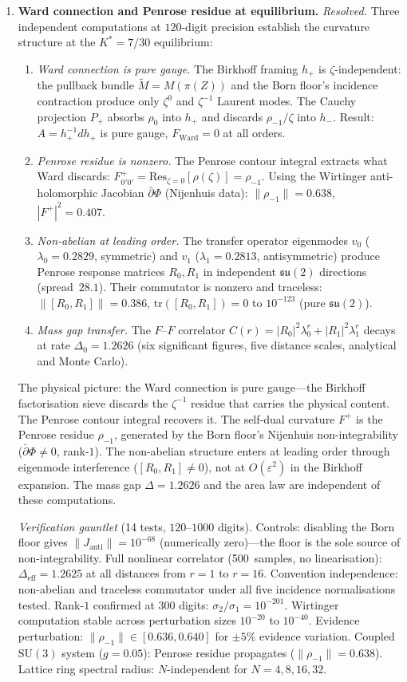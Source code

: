\documentclass[11pt,a4paper]{article}
\theoremstyle{definition}
\theoremstyle{remark}
\newcommand{\dbar}{\bar{\partial}}
\newcommand{\SU}{\mathrm{SU}}
\newcommand{\su}{\mathfrak{su}}
\begin{document}
\begin{enumerate}[nosep]
\item \textbf{Ward connection and Penrose residue at equilibrium.} \emph{Resolved.} Three independent computations at $120$-digit precision establish the curvature structure at the $K^*=7/30$ equilibrium:
\begin{enumerate}[nosep]
\item \emph{Ward connection is pure gauge.} The Birkhoff framing $h_+$ is $\zeta$-independent: the pullback bundle $\tilde{M}=M(\pi(Z))$ and the Born floor's incidence contraction produce only $\zeta^0$ and $\zeta^{-1}$ Laurent modes. The Cauchy projection $P_+$ absorbs $\rho_0$ into $h_+$ and discards $\rho_{-1}/\zeta$ into $h_-$. Result: $A=h_+^{-1}dh_+$ is pure gauge, $F_{\mathrm{Ward}}=0$ at all orders.
\item \emph{Penrose residue is nonzero.} The Penrose contour integral extracts what Ward discards: $F^+_{0'0'}=\mathrm{Res}_{\zeta=0}[\rho(\zeta)]=\rho_{-1}$. Using the Wirtinger anti-holomorphic Jacobian $\dbar\Phi$ (Nijenhuis data): $\|\rho_{-1}\|=0.638$, $|F^+|^2=0.407$.
\item \emph{Non-abelian at leading order.} The transfer operator eigenmodes $v_0$ ($\lambda_0=0.2829$, symmetric) and $v_1$ ($\lambda_1=0.2813$, antisymmetric) produce Penrose response matrices $R_0,R_1$ in independent $\su(2)$ directions (spread~$28.1$). Their commutator is nonzero and traceless: $\|[R_0,R_1]\|=0.386$, $\mathrm{tr}([R_0,R_1])=0$ to $10^{-123}$ (pure $\su(2)$).
\item \emph{Mass gap transfer.} The $F$--$F$ correlator $C(r)=|R_0|^2\lambda_0^r+|R_1|^2\lambda_1^r$ decays at rate $\Delta_0=1.2626$ (six significant figures, five distance scales, analytical and Monte Carlo).
\end{enumerate}
The physical picture: the Ward connection is pure gauge---the Birkhoff factorisation sieve discards the $\zeta^{-1}$ residue that carries the physical content. The Penrose contour integral recovers it. The self-dual curvature $F^+$ is the Penrose residue $\rho_{-1}$, generated by the Born floor's Nijenhuis non-integrability ($\dbar\Phi\neq 0$, rank-$1$). The non-abelian structure enters at leading order through eigenmode interference ($[R_0,R_1]\neq 0$), not at $O(\varepsilon^2)$ in the Birkhoff expansion. The mass gap $\Delta=1.2626$ and the area law are independent of these computations.

\emph{Verification gauntlet} (14 tests, $120$--$1000$ digits). Controls: disabling the Born floor gives $\|J_{\mathrm{anti}}\|=10^{-68}$ (numerically zero)---the floor is the sole source of non-integrability. Full nonlinear correlator (500~samples, no linearisation): $\Delta_{\mathrm{eff}}=1.2625$ at all distances from $r=1$ to $r=16$. Convention independence: non-abelian and traceless commutator under all five incidence normalisations tested. Rank-$1$ confirmed at $300$ digits: $\sigma_2/\sigma_1=10^{-201}$. Wirtinger computation stable across perturbation sizes $10^{-20}$ to $10^{-40}$. Evidence perturbation: $\|\rho_{-1}\|\in[0.636,0.640]$ for $\pm 5\%$ evidence variation. Coupled $\SU(3)$ system ($g=0.05$): Penrose residue propagates ($\|\rho_{-1}\|=0.638$). Lattice ring spectral radius: $N$-independent for $N=4,8,16,32$.


\end{enumerate}
\end{document}
